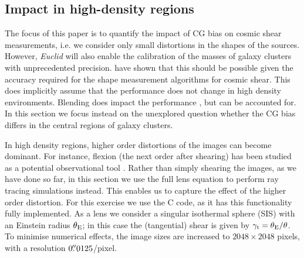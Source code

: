 \documentclass[useAMS,usenatbib]{mnras}
\begin{document}
\subsection{Impact in high-density regions}

The focus of this paper is to quantify the impact of CG bias on cosmic shear measurements,
i.e. we consider only small distortions in the shapes of the sources. However, {\it Euclid} will
also enable the calibration of the masses of galaxy clusters with unprecedented precision.
\cite{Koehlinger15} have shown that this should be possible given the accuracy required
for the shape measurement algorithms for cosmic shear. This does implicitly assume that the
performance does not change in high density environments. Blending does impact the performance
\citep{Hoekstra17}, but can be accounted for. In this section we focus instead on the unexplored question
whether the CG bias differs in the central regions of galaxy clusters.

In high density regions, higher order distortions of the images can become dominant. For instance, flexion (the next order after shearing) has been studied as a potential observational tool
\citep[e.g.][]{2002ApJ...564...65G,bacon2006}. Rather than simply shearing the images, as we have done so far, in this section we use the full lens equation to perform ray tracing simulations instead. This enables
us to capture the effect of the higher order distortion. For this exercise we use the {\sc C} code, as it has
this functionality fully implemented. As a lens we consider a singular isothermal sphere (SIS) with
an Einstein radius $\theta_{\rm E}$; in this case the (tangential) shear is given by
$\gamma_{\rm t}=$\textonehalf$\,\theta_{\rm E}/\theta$. To minimise numerical effects, the image sizes are increased to $2048\times2048$ pixels, with a resolution $0\hbox{$.\!\!^{\prime\prime}$}0125$/pixel.
\end{document}
